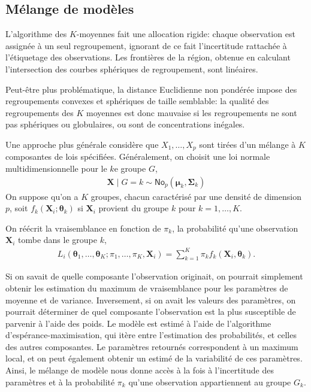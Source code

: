 \documentclass[
  11pt,
  letterpaper,
]{book}
\theoremstyle{definition}
\theoremstyle{remark}
\begin{document}
\hypertarget{muxe9lange-de-moduxe8les}{%
\subsection{Mélange de modèles}\label{muxe9lange-de-moduxe8les}}

L'algorithme des \(K\)-moyennes fait une allocation rigide: chaque
observation est assignée à un seul regroupement, ignorant de ce fait
l'incertitude rattachée à l'étiquetage des observations. Les frontières
de la région, obtenue en calculant l'intersection des courbes sphériques
de regroupement, sont linéaires.

Peut-être plus problématique, la distance Euclidienne non pondérée
impose des regroupements convexes et sphériques de taille semblable: la
qualité des regroupements des \(K\) moyennes est donc mauvaise si les
regroupements ne sont pas sphériques ou globulaires, ou sont de
concentrations inégales.

Une approche plus générale considère que \(X_1, \ldots, X_p\) sont
tirées d'un mélange à \(K\) composantes de lois spécifiées.
Généralement, on choisit une loi normale multidimensionnelle pour le
\(k\)e groupe \(G\), \begin{align*}
\boldsymbol{X} \mid G=k \sim \mathsf{No}_p(\boldsymbol{\mu}_k, \boldsymbol{\Sigma}_k)
\end{align*} On suppose qu'on a \(K\) groupes, chacun caractérisé par
une densité de dimension \(p\), soit
\(f_k(\boldsymbol{X}_i;\boldsymbol{\theta}_k)\) si \(\boldsymbol{X}_i\)
provient du groupe \(k\) pour \(k=1, \ldots, K\).

On réécrit la vraisemblance en fonction de \(\pi_k\), la probabilité
qu'une observation \(\mathbf{X}_i\) tombe dans le groupe \(k\),
\begin{align*}
 L_i(\boldsymbol{\theta}_1, \ldots, \boldsymbol{\theta}_K; \pi_1, \ldots, \pi_K, \mathbf{X}_i)= \sum_{k=1}^K\pi_k
f_{k}(\boldsymbol{X}_i,
\boldsymbol{\theta}_{k}).
\end{align*}

Si on savait de quelle composante l'observation originait, on pourrait
simplement obtenir les estimation du maximum de vraisemblance pour les
paramètres de moyenne et de variance. Inversement, si on avait les
valeurs des paramètres, on pourrait déterminer de quel composante
l'observation est la plus susceptible de parvenir à l'aide des poids. Le
modèle est estimé à l'aide de l'algorithme d'espérance-maximisation, qui
itère entre l'estimation des probabilités, et celles des autres
composantes. Le paramètres retournés correspondent à un maximum local,
et on peut également obtenir un estimé de la variabilité de ces
paramètres. Ainsi, le mélange de modèle nous donne accès à la fois à
l'incertitude des paramètres et à la probabilité \(\pi_k\) qu'une
observation appartiennent au groupe \(G_k\).
\end{document}
